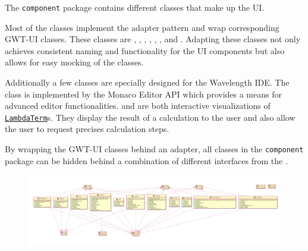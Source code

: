 The \texttt{component} package contains different classes that make up the UI.

Most of the classes implement the adapter pattern and wrap corresponding GWT-UI classes. 
These classes are \texttt{}, \texttt{}, \texttt{}, 
\texttt{}, \texttt{}, \texttt{}, \texttt{} and \texttt{}.
Adapting these classes not only achieves consistent naming and functionality for the UI components
but also allows for easy mocking of the classes.

Additionally a few classes are specially designed for the Wavelength IDE. The \texttt{} 
class is implemented by the Monaco Editor API which provides a means for advanced editor functionalities. 
\texttt{} and \texttt{} are both interactive visualizations of 
\texttt{\hyperref[type:edu.kit.wavelength.client.model.term.LambdaTerm]{LambdaTerm}}s. They display 
the result of a calculation to the user and also allow the user to request precises calculation steps.

By wrapping the GWT-UI classes behind an adapter, all classes in the \texttt{component} package can
be hidden behind a combination of different interfaces from the \texttt{}.

\begin{figure}[H]
	\centering
	\includegraphics[width=\textwidth]{packageDiagrams/componentsPackage}
\end{figure}
